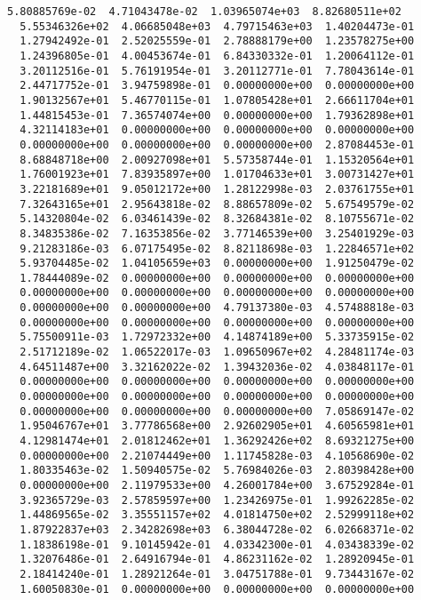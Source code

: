 \documentclass[11pt]{article}
\begin{document}
\begin{Verbatim}[commandchars=\\\{\}]
  5.80885769e-02  4.71043478e-02  1.03965074e+03  8.82680511e+02
  5.55346326e+02  4.06685048e+03  4.79715463e+03  1.40204473e-01
  1.27942492e-01  2.52025559e-01  2.78888179e+00  1.23578275e+00
  1.24396805e-01  4.00453674e-01  6.84330332e-01  1.20064112e-01
  3.20112516e-01  5.76191954e-01  3.20112771e-01  7.78043614e-01
  2.44717752e-01  3.94759898e-01  0.00000000e+00  0.00000000e+00
  1.90132567e+01  5.46770115e-01  1.07805428e+01  2.66611704e+01
  1.44815453e-01  7.36574074e+00  0.00000000e+00  1.79362898e+01
  4.32114183e+01  0.00000000e+00  0.00000000e+00  0.00000000e+00
  0.00000000e+00  0.00000000e+00  0.00000000e+00  2.87084453e-01
  8.68848718e+00  2.00927098e+01  5.57358744e-01  1.15320564e+01
  1.76001923e+01  7.83935897e+00  1.01704633e+01  3.00731427e+01
  3.22181689e+01  9.05012172e+00  1.28122998e-03  2.03761755e+01
  7.32643165e+01  2.95643818e-02  8.88657809e-02  5.67549579e-02
  5.14320804e-02  6.03461439e-02  8.32684381e-02  8.10755671e-02
  8.34835386e-02  7.16353856e-02  3.77146539e+00  3.25401929e-03
  9.21283186e-03  6.07175495e-02  8.82118698e-03  1.22846571e+02
  5.93704485e-02  1.04105659e+03  0.00000000e+00  1.91250479e-02
  1.78444089e-02  0.00000000e+00  0.00000000e+00  0.00000000e+00
  0.00000000e+00  0.00000000e+00  0.00000000e+00  0.00000000e+00
  0.00000000e+00  0.00000000e+00  4.79137380e-03  4.57488818e-03
  0.00000000e+00  0.00000000e+00  0.00000000e+00  0.00000000e+00
  5.75500911e-03  1.72972332e+00  4.14874189e+00  5.33735915e-02
  2.51712189e-02  1.06522017e-03  1.09650967e+02  4.28481174e-03
  4.64511487e+00  3.32162022e-02  1.39432036e-02  4.03848117e-01
  0.00000000e+00  0.00000000e+00  0.00000000e+00  0.00000000e+00
  0.00000000e+00  0.00000000e+00  0.00000000e+00  0.00000000e+00
  0.00000000e+00  0.00000000e+00  0.00000000e+00  7.05869147e-02
  1.95046767e+01  3.77786568e+00  2.92602905e+01  4.60565981e+01
  4.12981474e+01  2.01812462e+01  1.36292426e+02  8.69321275e+00
  0.00000000e+00  2.21074449e+00  1.11745828e-03  4.10568690e-02
  1.80335463e-02  1.50940575e-02  5.76984026e-03  2.80398428e+00
  0.00000000e+00  2.11979533e+00  4.26001784e+00  3.67529284e-01
  3.92365729e-03  2.57859597e+00  1.23426975e-01  1.99262285e-02
  1.44869565e-02  3.35551157e+02  4.01814750e+02  2.52999118e+02
  1.87922837e+03  2.34282698e+03  6.38044728e-02  6.02668371e-02
  1.18386198e-01  9.10145942e-01  4.03342300e-01  4.03438339e-02
  1.32076486e-01  2.64916794e-01  4.86231162e-02  1.28920945e-01
  2.18414240e-01  1.28921264e-01  3.04751788e-01  9.73443167e-02
  1.60050830e-01  0.00000000e+00  0.00000000e+00  0.00000000e+00

\end{Verbatim}
\end{document}
